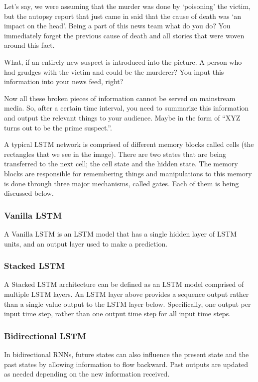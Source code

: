 \documentclass[12pt]{report}
\begin{document}
Let’s say, we were assuming that the murder was done by ‘poisoning’ the victim, but the autopsy report that just came in said that the cause of death was ‘an impact on the head’. Being a part of this news team what do you do? You immediately forget the previous cause of death and all stories that were woven around this fact.

What, if an entirely new suspect is introduced into the picture. A person who had grudges with the victim and could be the murderer? You input this information into your news feed, right?

Now all these broken pieces of information cannot be served on mainstream media. So, after a certain time interval, you need to summarize this information and output the relevant things to your audience. Maybe in the form of “XYZ turns out to be the prime suspect.”.\cite{17}

A typical LSTM network is comprised of different memory blocks called cells
(the rectangles that we see in the image).  There are two states that are being transferred to the next cell; the cell state and the hidden state. The memory blocks are responsible for remembering things and manipulations to this memory is done through three major mechanisms, called gates. Each of them is being discussed below.

\subsubsection{Vanilla LSTM}
A Vanilla LSTM is an LSTM model that has a single hidden layer of LSTM units, and an output layer used to make a prediction. \cite{18}

\subsubsection{Stacked LSTM}

A Stacked LSTM architecture can be defined as an LSTM model comprised of multiple LSTM layers. An LSTM layer above provides a sequence output rather than a single value output to the LSTM layer below. Specifically, one output per input time step, rather than one output time step for all input time steps.

\subsubsection{Bidirectional LSTM}
In bidirectional RNNs, future states can also influence the present state and the past states by allowing information to flow backward. Past outputs are updated as needed depending on the new information received.
\end{document}
